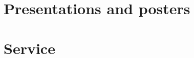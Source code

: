 \documentclass[14pt]{prometheus_cv}
\begin{document}
\section{Presentations and posters}


%

\section{Service}


%
\end{document}
